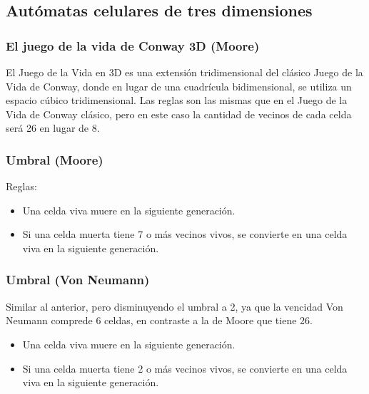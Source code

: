 \subsection{Autómatas celulares de tres dimensiones}
\label{subsec:3d}

\subsubsection{El juego de la vida de Conway 3D (Moore)}
El Juego de la Vida en 3D es una extensión tridimensional del clásico Juego de la Vida de Conway, donde en lugar de una cuadrícula bidimensional, se utiliza un espacio cúbico tridimensional.
Las reglas son las mismas que en el Juego de la Vida de Conway clásico, pero en este caso la cantidad de vecinos de cada celda será 26 en lugar de 8.

\subsubsection{Umbral (Moore)}
Reglas:
\begin{itemize}
    \item Una celda viva muere en la siguiente generación.
    \item Si una celda muerta tiene 7 o más vecinos vivos, se convierte en una celda viva en la siguiente generación.
\end{itemize}

\subsubsection{Umbral (Von Neumann)}
Similar al anterior, pero disminuyendo el umbral a 2, ya que la vencidad Von Neumann comprede 6 celdas, en contraste a la de Moore que tiene 26.
\begin{itemize}
    \item Una celda viva muere en la siguiente generación.
    \item Si una celda muerta tiene 2 o más vecinos vivos, se convierte en una celda viva en la siguiente generación.
\end{itemize}


